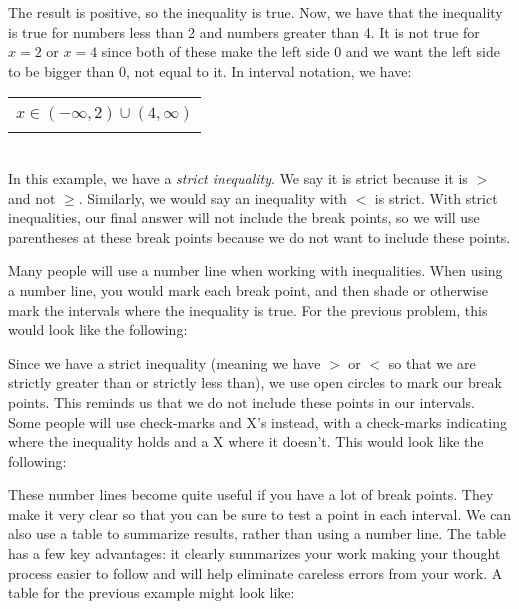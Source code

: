 {The result is positive, so the inequality is true. Now, we have that the inequality is true for numbers less than 2 and numbers greater than 4. It is not true for $x=2$ or $x=4$ since both of these make the left side 0 and we want the left side to be bigger than 0, not equal to it. In interval notation, we have:
	\begin{center}
		\begin{tabular}{| c |} \hline
			\\[-4pt]
			$\displaystyle x \in  (-\infty,2)\cup(4,\infty)$ \\[-4pt]
			\\\hline
		\end{tabular}
	\end{center}}\\

In this example, we have a \emph{strict inequality}. We say it is strict because it is $>$ and not $\geq$. Similarly, we would say an inequality with $<$ is strict. With strict inequalities, our final answer will not include the break points, so we will use parentheses at these break points because we do not want to include these points.

Many people will use a number line when working with inequalities. When using a number line, you would mark each break point, and then shade or otherwise mark the intervals where the inequality is true. For the previous problem, this would look like the following:

\begin{center}
\label{fig:ineq_num_line1}
\end{center}


\noindent
Since we have a strict inequality (meaning we have $>$ or $<$ so that we are strictly greater than or strictly less than), we use open circles to mark our break points. This reminds us that we do not include these points in our intervals. Some people will use check-marks and X's instead, with a check-marks indicating where the inequality holds and a X where it doesn't. This would look like the following:

\begin{center}
\label{fig:ineq_num_line2}
\end{center}

\noindent
These number lines become quite useful if you have a lot of break points. They make it very clear so that you can be sure to test a point in each interval. We can also use a table to summarize results, rather than using a number line. The table has a few key advantages: it clearly summarizes your work making your thought process easier to follow and will help eliminate careless errors from your work. A table for the previous example might look like:

